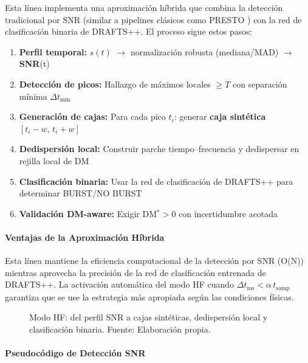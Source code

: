 Esta línea implementa una aproximación híbrida que combina la detección tradicional por SNR (similar a pipelines clásicos como PRESTO \cite{ransom_presto}) con la red de clasificación binaria de DRAFTS++. El proceso sigue estos pasos:

\begin{enumerate}
\item \textbf{Perfil temporal:} $s(t)$ $\rightarrow$ normalización robusta (mediana/MAD) $\rightarrow$ \textbf{SNR}(t)
\item \textbf{Detección de picos:} Hallazgo de máximos locales $\ge T$ con separación mínima $\Delta t_{\min}$
\item \textbf{Generación de cajas:} Para cada pico $t_i$: generar \textbf{caja sintética} $[t_i-w,\, t_i+w]$
\item \textbf{Dedispersión local:} Construir parche tiempo--frecuencia y dedispersar en rejilla local de DM
\item \textbf{Clasificación binaria:} Usar la red de clasificación de DRAFTS++ para determinar BURST/NO BURST
\item \textbf{Validación DM-aware:} Exigir DM$^\ast\!>\!0$ con incertidumbre acotada
\end{enumerate}

\paragraph{Ventajas de la Aproximación Híbrida}

Esta línea mantiene la eficiencia computacional de la detección por SNR (O(N)) mientras aprovecha la precisión de la red de clasificación entrenada de DRAFTS++. La activación automática del modo HF cuando $\Delta t_{\mathrm{ms}} < \alpha\, t_{\mathrm{samp}}$ garantiza que se use la estrategia más apropiada según las condiciones físicas.

\begin{figure}[H] 
\centering 
\caption{Modo HF: del perfil SNR a cajas sintéticas, dedispersión local y clasificación binaria. Fuente: Elaboración propia.}
\label{fig:hf} 
\end{figure}

\paragraph{Pseudocódigo de Detección SNR}

